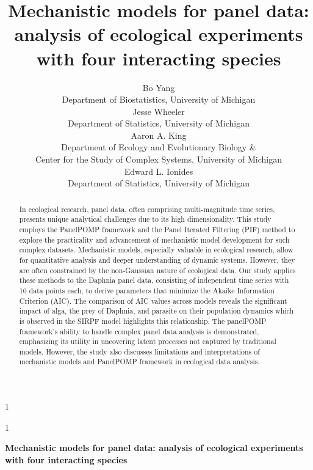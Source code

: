 \documentclass[12pt]{article}
\newcommand{\blind}{1}
\begin{document}

\def\spacingset#1{\renewcommand{\baselinestretch}%
{#1}\small\normalsize} \spacingset{1}


\blind
{
  \title{\bf Mechanistic models for panel data: analysis of ecological experiments with four interacting species}
\author{Bo Yang\\Department of Biostatistics, University of Michigan \\
        Jesse Wheeler\\Department of Statistics, University of Michigan \\
        Aaron A. King\\Department of Ecology and Evolutionary Biology \& \\ Center for the Study of Complex Systems, University of Michigan\\
        Edward L. Ionides\\Department of Statistics, University of Michigan}
  \maketitle
} \fi


\blind
{
  \bigskip
  \bigskip
  \bigskip
  \begin{center}
    {\LARGE\bf Mechanistic models for panel data: analysis of ecological experiments with four interacting species}
\end{center}
  \medskip
} \fi




\bigskip
\begin{abstract}
In ecological research, panel data, often comprising multi-magnitude time series, presents unique analytical challenges due to its high dimensionality. This study employs the PanelPOMP framework and the Panel Iterated Filtering (PIF) method to explore the practicality and advancement of mechanistic model development for such complex datasets. Mechanistic models, especially valuable in ecological research, allow for quantitative analysis and deeper understanding of dynamic systems. However, they are often constrained by the non-Gaussian nature of ecological data. Our study applies these methods to the Daphnia panel data, consisting of independent time series with 10 data points each, to derive parameters that minimize the Akaike Information Criterion (AIC). The comparison of AIC values across models reveals the significant impact of alga, the prey of Daphnia, and parasite on their population dynamics which is observed in the SIRPF model highlights this relationship. The panelPOMP framework's ability to handle complex panel data analysis is demonstrated, emphasizing its utility in uncovering latent processes not captured by traditional models. However, the study also discusses limitations and interpretations of mechanistic models and PanelPOMP framework in ecological data analysis.
\end{abstract}
\end{document}

